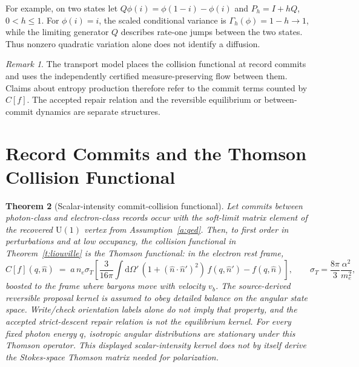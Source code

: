 \documentclass[11pt]{article}
\newtheorem{theorem}{Theorem}[section]
\theoremstyle{remark}
\newtheorem{remark}[theorem]{Remark}
\newcommand{\Dd}{\mathrm{d}}
\begin{document}
For example, on two states let $Q\phi(i)=\phi(1-i)-\phi(i)$ and
$P_h=I+hQ$, $0<h\leq1$. For $\phi(i)=i$, the scaled conditional
variance is $\Gamma_h(\phi)=1-h\to1$, while the limiting generator
$Q$ describes rate-one jumps between the two states. Thus nonzero
quadratic variation alone does not identify a diffusion.

\begin{remark}
The transport model places the collision functional at record commits and
uses the independently certified measure-preserving flow between them. Claims
about entropy production therefore refer to the commit terms counted by
$C[f]$. The accepted repair relation and the reversible equilibrium or
between-commit dynamics are separate structures.
\end{remark}

\section{Record Commits and the Thomson Collision Functional}

\begin{theorem}[Scalar-intensity commit-collision functional]\label{t:collision}
Let commits between photon-class and electron-class records occur with the
soft-limit matrix element of the recovered $\mathrm U(1)$ vertex from
Assumption~\ref{a:qed}.
Then, to first order in perturbations and at low occupancy, the collision
functional in Theorem~\ref{t:liouville} is the Thomson functional: in the
electron rest frame,
\[
C[f](q,\hat n)\;=\;a\,n_e\sigma_T\left[
\frac{3}{16\pi}\int \Dd\Omega'\,(1+(\hat n\cdot\hat n')^2)\,f(q,\hat n')
- f(q,\hat n)\right],
\qquad
\sigma_T=\frac{8\pi}{3}\frac{\alpha^2}{m_e^2},
\]
boosted to the frame where baryons move with velocity $v_b$. The
source-derived reversible proposal kernel is assumed to obey detailed balance
on the angular state space. Write/check orientation labels alone do not imply
that property, and the accepted strict-descent repair relation is not the
equilibrium kernel. For every fixed photon energy $q$, isotropic angular
distributions are stationary under this Thomson operator. This displayed
scalar-intensity kernel does not by itself derive the Stokes-space Thomson
matrix needed for polarization.
\end{theorem}
\end{document}
